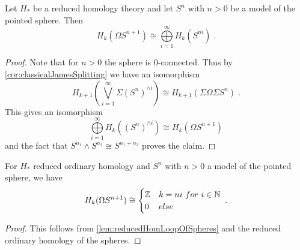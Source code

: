 \begin{lemma}\label{lem:reducedHomLoopOfSpheres}
    Let $H_*$ be a reduced homology theory and let $S^n$ with $n>0$ be a model of the pointed sphere.
    Then
    \begin{equation*}
        H_k(\Omega S^{n+1})\cong\bigoplus\limits_{i=1}^{\infty}H_k(S^{ni})\;.
    \end{equation*}
    \begin{proof}
        Note that for $n>0$ the sphere is $0$-connected.
        Thus by \cref{cor:classicalJamesSplitting} we have an isomorphism 
        \begin{equation*}
            H_{k+1}\left(\bigvee\limits_{i=1}^{\infty}\Sigma \left(S^n\right)^{\wedge i}\right)\cong H_{k+1}\left(\Sigma\Omega\Sigma S^n\right)\;.
        \end{equation*}
        This gives an isomorphism
        \begin{equation*}
            \bigoplus\limits_{i=1}^{\infty}H_k\left(\left(S^n\right)^{\wedge i}\right)\cong H_k\left(\Omega S^{n+1}\right)
        \end{equation*}
        and the fact that $S^{n_1}\wedge S^{n_2}\cong S^{n_1+n_2}$ proves the claim.
    \end{proof}
\end{lemma}
\begin{corollary}
    For $H_*$ reduced ordinary homology and $S^n$ with $n>0$ a model of the pointed sphere, we have
    \begin{equation*}
        H_k(\Omega S^{n+1})\cong
        \begin{cases}
            \mathbb{Z} & k=ni ~for~ i\in\mathbb{N}\\
            0 & else
        \end{cases}\;.
    \end{equation*}
    \begin{proof}
        This follows from \cref{lem:reducedHomLoopOfSpheres} and the reduced ordinary homology of the spheres.
    \end{proof}
\end{corollary}
